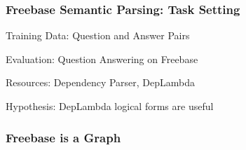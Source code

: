 \documentclass[mathserif,12pt]{beamer}
\newcommand{\hlight}[1]{{\color{blue!80} #1}}
\begin{document}
\begin{frame}
\frametitle{Freebase Semantic Parsing: Task Setting}
\large

\hlight{Training Data:} Question and Answer Pairs

\vspace{2em}
\hlight{Evaluation:} Question Answering on Freebase

\vspace{2em}
\hlight{Resources:} Dependency Parser, DepLambda

\vspace{2em}
\hlight{Hypothesis}: DepLambda logical forms are useful
\end{frame}

\begin{frame}
\frametitle{Freebase is a Graph}
\begin{center}

\end{center}
\end{frame}
\end{document}
